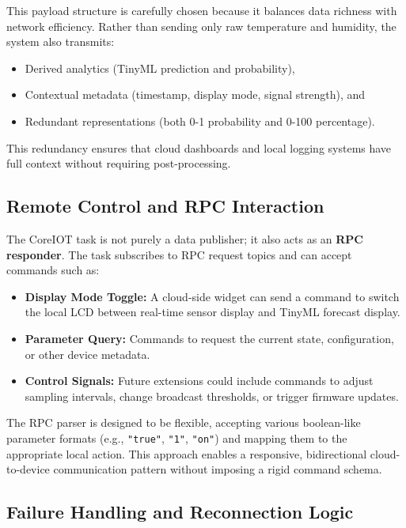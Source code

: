 This payload structure is carefully chosen because it balances data richness with network efficiency. Rather than sending only raw temperature and humidity, the system also transmits:
\begin{itemize}
  \item Derived analytics (TinyML prediction and probability),
  \item Contextual metadata (timestamp, display mode, signal strength), and
  \item Redundant representations (both 0-1 probability and 0-100 percentage).
\end{itemize}

This redundancy ensures that cloud dashboards and local logging systems have full context without requiring post-processing.

\subsection*{Remote Control and RPC Interaction}

The CoreIOT task is not purely a data publisher; it also acts as an \textbf{RPC responder}. The task subscribes to RPC request topics and can accept commands such as:
\begin{itemize}
  \item \textbf{Display Mode Toggle:} A cloud-side widget can send a command to switch the local LCD between real-time sensor display and TinyML forecast display.
  \item \textbf{Parameter Query:} Commands to request the current state, configuration, or other device metadata.
  \item \textbf{Control Signals:} Future extensions could include commands to adjust sampling intervals, change broadcast thresholds, or trigger firmware updates.
\end{itemize}

The RPC parser is designed to be flexible, accepting various boolean-like parameter formats (e.g., \texttt{"true"}, \texttt{"1"}, \texttt{"on"}) and mapping them to the appropriate local action. This approach enables a responsive, bidirectional cloud-to-device communication pattern without imposing a rigid command schema.

\subsection*{Failure Handling and Reconnection Logic}

